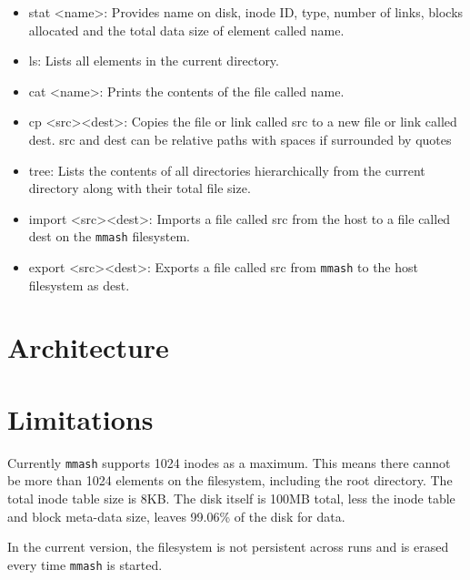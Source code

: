 \documentclass[]{article}
\begin{document}
\begin{itemize}
	\item stat \textless name\textgreater: Provides name on disk, inode ID, type, number of links, blocks allocated and the total data size of element called name. 
	
	\item ls: Lists all elements in the current directory. 
	
	\item cat \textless name\textgreater: Prints the contents of the file called name. 
	
	\item cp \textless src\textgreater \space \textless dest\textgreater: Copies the file or link called src to a new file or link called dest. src and dest can be relative paths with spaces if surrounded by quotes
	
	\item tree: Lists the contents of all directories hierarchically from the current directory along with their total file size.
	
	\item import \textless src\textgreater \space \textless dest\textgreater: Imports a file called src from the host to a file called dest on the \texttt{mmash} filesystem. 
	
	\item export \textless src\textgreater \space \textless dest\textgreater: Exports a file called src from \texttt{mmash} to the host filesystem as dest. 
\end{itemize}

\section{Architecture}

\section{Limitations}

Currently \texttt{mmash} supports 1024 inodes as a maximum. This means there cannot be more than 1024 elements on the filesystem, including the root directory. The total inode table size is 8KB. The disk itself is 100MB total, less the inode table and block meta-data size, leaves 99.06\% of the disk for data. 

In the current version, the filesystem is not persistent across runs and is erased every time \texttt{mmash} is started. 
\end{document}

